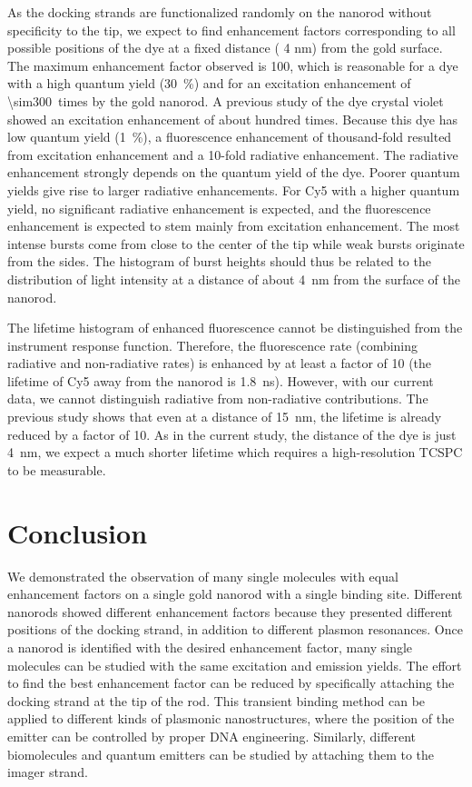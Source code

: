 As the docking strands are functionalized randomly on the nanorod without specificity to the tip, we expect to find enhancement factors corresponding to all possible positions of the dye at a fixed distance ( 4 nm) from the gold surface.
The maximum enhancement factor observed is 100, which is reasonable for a dye with a high quantum yield (\SI{30}{\percent}) and for an excitation enhancement of \SI{\sim300}{times} by the gold nanorod.
A previous study of the dye crystal violet showed an excitation enhancement of about hundred times. Because this dye has low quantum yield (\SI{1}{\percent}), a fluorescence enhancement of thousand-fold resulted from excitation enhancement and a 10-fold radiative enhancement. The radiative enhancement strongly depends on the quantum yield of the dye. Poorer quantum yields give rise to larger radiative enhancements. For Cy5 with a higher quantum yield, no significant radiative enhancement is expected, and the fluorescence enhancement is expected to stem mainly from excitation enhancement.
The most intense bursts come from close to the center of the tip while weak bursts originate from the sides.
The histogram of burst heights should thus be related to the distribution of light intensity at a distance of about \SI{4}{\nm} from the surface of the nanorod.


The lifetime histogram of enhanced fluorescence cannot be distinguished from the instrument response function. Therefore, the fluorescence rate (combining radiative and non-radiative rates) is enhanced by at least a factor of 10 (the lifetime of Cy5 away from the nanorod is \SI{1.8}{\ns}). However, with our current data, we cannot distinguish radiative from non-radiative contributions.
The previous study\cite{seelig2007nanoparticleinduced} shows that even at a distance of \SI{15}{\nm}, the lifetime is already reduced by a factor of 10.
As in the current study, the distance of the dye is just \SI{4}{\nm}, we expect a much shorter lifetime which requires a high-resolution TCSPC to be measurable.


\section{Conclusion}
We demonstrated the observation of many single molecules with equal enhancement factors on a single gold nanorod with a single binding site.
Different nanorods showed different enhancement factors because they presented different positions of the docking strand, in addition to different plasmon resonances.
Once a nanorod is identified with the desired enhancement factor, many single molecules can be studied with the same excitation and emission yields.
The effort to find the best enhancement factor can be reduced by specifically attaching the docking strand at the tip of the rod.
This transient binding method can be applied to different kinds of plasmonic nanostructures, where the position of the emitter can be controlled by proper DNA engineering.
Similarly, different biomolecules and quantum emitters can be studied by attaching them to the imager strand.


